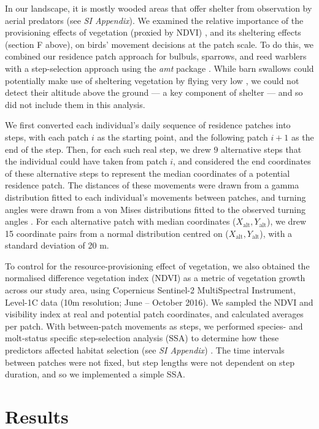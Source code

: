 \begin{refsection}
In our landscape, it is mostly wooded areas that offer shelter from observation by aerial predators (see \textit{SI Appendix}).
We examined the relative importance of the provisioning effects of vegetation (proxied by NDVI) \cite{pettorelli2011}, and its sheltering effects (section F above), on birds' movement decisions at the patch scale.
To do this, we combined our residence patch approach for bulbuls, sparrows, and reed warblers with a step-selection approach \citep{thurfjell2014,avgar2016} using the \textit{amt} package \citep{signer2019}.
While barn swallows could potentially make use of sheltering vegetation by flying very low \cite{warrick2016}, we could not detect their altitude above the ground --- a key component of shelter --- and so did not include them in this analysis.

We first converted each individual's daily sequence of residence patches into steps, with each patch $i$ as the starting point, and the following patch $i+1$ as the end of the step.
Then, for each such real step, we drew 9 alternative steps that the individual could have taken from patch $i$, and considered the end coordinates of these alternative steps to represent the median coordinates of a potential residence patch.
The distances of these movements were drawn from a gamma distribution fitted to each individual's movements between patches, and turning angles were drawn from a von Mises distributions fitted to the observed turning angles \citep{signer2019}.
For each alternative patch with median coordinates ($X_\text{alt}, Y_\text{alt}$), we drew 15 coordinate pairs from a normal distribution centred on ($X_\text{alt}, Y_\text{alt}$), with a standard deviation of 20 m.

To control for the resource-provisioning effect of vegetation, we also obtained the normalised difference vegetation index (NDVI) as a metric of vegetation growth \citep{pettorelli2011} across our study area, using Copernicus Sentinel-2 MultiSpectral Instrument, Level-1C data (10m resolution; June -- October 2016).
We sampled the NDVI and visibility index at real and potential patch coordinates, and calculated averages per patch.
With between-patch movements as steps, we performed species- and molt-status specific step-selection analysis (SSA) to determine how these predictors affected habitat selection (see \textit{SI Appendix}) \cite{avgar2016}.
The time intervals between patches were not fixed, but step lengths were not dependent on step duration, and so we implemented a simple SSA.

\section*{Results}


\end{refsection}
